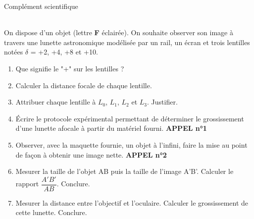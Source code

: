 \documentclass[a4paper,11pt,fleqn]{scrartcl}%
\begin{document}
\begin{minipage}{\linewidth}
\begin{documentboxenv}{Complément scientifique}
\begin{center}
	\end{center}
\end{documentboxenv}
\end{minipage}\\

On dispose d'un objet (lettre \textbf{F} éclairée). On souhaite observer son image à travers une lunette astronomique modélisée par un rail, un écran et trois lentilles notées $\delta$ = +2, +4, +8 et +10.
\begin{enumerate}
	\item Que signifie le "+" sur les lentilles ?
	\item Calculer la distance focale de chaque lentille.
	\item Attribuer chaque lentille à $L_0$, $L_1$, $L_2$ et $L_3$. Justifier.
	\item Écrire le protocole expérimental permettant de déterminer le grossissement d'une lunette afocale à partir du matériel fourni. \textbf{APPEL n°1}
	\item Observer, avec la maquette fournie, un objet à l'infini, faire la mise au point de façon à obtenir une image nette. \textbf{APPEL n°2}
	\item Mesurer la taille de l'objet AB puis la taille de l'image A'B'. Calculer le rapport $\dfrac{A'B'}{AB}$. Conclure.
	\item Mesurer la distance entre l'objectif et l'oculaire. Calculer le grossissement de cette lunette. Conclure.
\end{enumerate}
\end{document}
